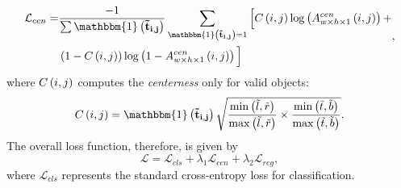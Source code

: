 \begin{equation}
    \begin{aligned}
        \label{eq:SiamCARCenLoss}
        \mathcal{L}_{cen} =
         & \frac{-1}{\sum \func{\mathbbm{1}}{\vect{\tilde{t}_{i, j}}}}
        \sum_{
            \func{\mathbbm{1}}{\vect{\tilde{t}_{i, j}}} = 1
        }
        \Big[
            \func{C}{i, j}
            \func{\log}{
                \func{\subsup{A}{w \times h \times 1}{cen}}{i, j}
            }
        +                                                              \\
         & \rbrackets{1 - \func{C}{i, j}}
            \func{\log}{
                1 - \func{\subsup{A}{w \times h \times 1}{cen}}{i, j}
            }
            \Big]
    \end{aligned},
\end{equation}
where ${C} \left( i, j \right)$ computes the \emph{centerness} only for valid objects:
\begin{equation}
    \label{eq:CenternesSiamCAR}
    \func{C}{i, j} =
    \func{\mathbbm{1}}{\vect{\tilde{t}_{i, j}}}
    \sqrt{
        \frac{
            \func{\min}{\tilde{l}, \tilde{r}}
        }{
            \func{\max}{\tilde{l}, \tilde{r}}
        }
        \times
        \frac{
            \func{\min}{\tilde{t}, \tilde{b}}
        }{
            \func{\max}{\tilde{t}, \tilde{b}}
        }
    }.
\end{equation}
The overall loss function, therefore, is given by
\begin{equation}
    \label{eq:SiamCAROverallLoss}
    \mathcal{L} =
    \mathcal{L}_{cls} +
    \lambda_1 \mathcal{L}_{cen} +
    \lambda_2 \mathcal{L}_{reg},
\end{equation}
where $\mathcal{L}_{cls}$ represents the standard cross-entropy loss for classification.
